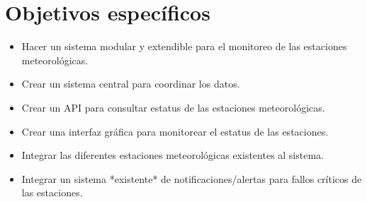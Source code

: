\section{Objetivos específicos}

\begin{itemize}
   \item Hacer un sistema modular y extendible para el monitoreo de las estaciones meteorológicas.

   \item Crear un sistema central para coordinar los datos.

   \item Crear un API para consultar estatus de las estaciones meteorológicas.

   \item Crear una interfaz gráfica para monitorear el estatus de las estaciones.

   \item Integrar las diferentes estaciones meteorológicas existentes al sistema.

   \item Integrar un sistema *existente* de notificaciones/alertas para fallos críticos de las estaciones.
\end{itemize}
